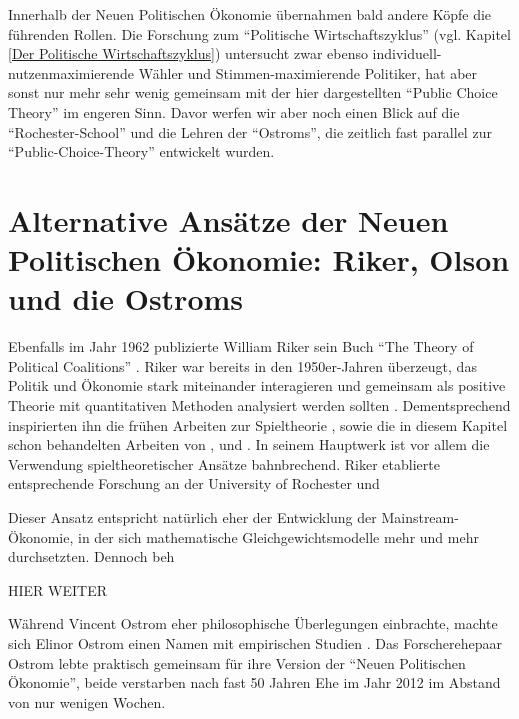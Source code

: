 Innerhalb der Neuen Politischen Ökonomie übernahmen bald andere Köpfe die führenden Rollen. Die Forschung zum "`Politische Wirtschaftszyklus"' (vgl. Kapitel \ref{Der Politische Wirtschaftszyklus}) untersucht zwar ebenso individuell-nutzenmaximierende Wähler und Stimmen-maximierende Politiker, hat aber sonst nur mehr sehr wenig gemeinsam mit der hier dargestellten "`Public Choice Theory"' im engeren Sinn. Davor werfen wir aber noch einen Blick auf die "`Rochester-School"' und die Lehren der "`Ostroms"', die zeitlich fast parallel zur "`Public-Choice-Theory"' entwickelt wurden.

\section{Alternative Ansätze der Neuen Politischen Ökonomie: Riker, Olson und die Ostroms }

Ebenfalls im Jahr 1962 publizierte William Riker sein Buch "`The Theory of Political Coalitions"' \parencite{Riker1962}. Riker war bereits in den 1950er-Jahren überzeugt, das Politik und Ökonomie stark miteinander interagieren und gemeinsam als positive Theorie mit quantitativen Methoden analysiert werden sollten \parencite[S. 205]{Maske2003}. Dementsprechend inspirierten ihn die frühen Arbeiten zur Spieltheorie \parencite{Morgenstern1944}, sowie die in diesem Kapitel schon behandelten Arbeiten von \textcite{Downs1957b}, \textcite{Black1948a} und \textcite{Arrow1951} \parencite[S. 205]{Maske2003}. In seinem Hauptwerk \textcite{Riker1962} ist vor allem die Verwendung spieltheoretischer Ansätze bahnbrechend. Riker etablierte entsprechende Forschung an der University of Rochester und

Dieser Ansatz entspricht natürlich eher der Entwicklung der Mainstream-Ökonomie, in der sich mathematische Gleichgewichtsmodelle mehr und mehr durchsetzten. Dennoch beh 







HIER WEITER
\textcite[S. 176]{Romer1988}
\textcite[S. 102]{Mitchell1988}
\textcite{Maske2003}


Während Vincent Ostrom eher philosophische Überlegungen einbrachte, machte sich Elinor Ostrom einen Namen mit empirischen Studien \parencite[S. 110]{Mitchell1988}. Das Forscherehepaar Ostrom lebte praktisch gemeinsam für ihre Version der "`Neuen Politischen Ökonomie"', beide verstarben nach fast 50 Jahren Ehe im Jahr 2012 im Abstand von nur wenigen Wochen. 


